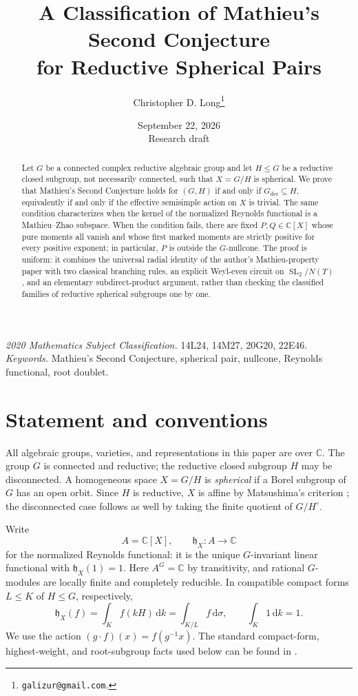 \documentclass[11pt]{article}
\title{A Classification of Mathieu's Second Conjecture\\for Reductive Spherical Pairs}
\author{Christopher D. Long\thanks{\texttt{galizur@gmail.com}.}}
\date{September 22, 2026\\[2pt]\small Research draft}
\numberwithin{equation}{section}
\theoremstyle{definition}
\theoremstyle{remark}
\newcommand{\C}{\mathbb C}
\newcommand{\hX}{\mathfrak h_X}
\newcommand{\dd}{\,\mathrm d}
\DeclareMathOperator{\SL}{SL}
\newcommand{\der}{\mathrm{der}}
\begin{document}
\maketitle
\begin{abstract}
Let $G$ be a connected complex reductive algebraic group and let $H\leq G$ be a reductive closed subgroup, not necessarily connected, such that $X=G/H$ is spherical. We prove that Mathieu's Second Conjecture holds for $(G,H)$ if and only if $G_{\der}\subseteq H$, equivalently if and only if the effective semisimple action on $X$ is trivial. The same condition characterizes when the kernel of the normalized Reynolds functional is a Mathieu--Zhao subspace. When the condition fails, there are fixed $P,Q\in\C[X]$ whose pure moments all vanish and whose first marked moments are strictly positive for every positive exponent; in particular, $P$ is outside the $G$-nullcone. The proof is uniform: it combines the universal radial identity of the author's Mathieu-property paper with two classical branching rules, an explicit Weyl-even circuit on $\SL_2/N(T)$, and an elementary subdirect-product argument, rather than checking the classified families of reductive spherical subgroups one by one.
\end{abstract}
\smallskip
\noindent\textit{2020 Mathematics Subject Classification.} 14L24, 14M27, 20G20, 22E46.\\
\textit{Keywords.} Mathieu's Second Conjecture, spherical pair, nullcone, Reynolds functional, root doublet.

\section{Statement and conventions}
All algebraic groups, varieties, and representations in this paper are over $\C$. The group $G$ is connected and reductive; the reductive closed subgroup $H$ may be disconnected. A homogeneous space $X=G/H$ is \emph{spherical} if a Borel subgroup of $G$ has an open orbit. Since $H$ is reductive, $X$ is affine by Matsushima's criterion \cite{Matsushima}; the disconnected case follows as well by taking the finite quotient of $G/H^\circ$.

Write
\[
 A=\C[X],\qquad
 \hX:A\longrightarrow\C
\]
for the normalized Reynolds functional: it is the unique $G$-invariant linear functional with $\hX(1)=1$. Here $A^G=\C$ by transitivity, and rational $G$-modules are locally finite and completely reducible. In compatible compact forms $L\leq K$ of $H\leq G$, respectively,
\begin{equation}\label{eq:compact}
 \hX(f)=\int_K f(kH)\dd k=\int_{K/L}f\dd\sigma,
 \qquad \int_K1\dd k=1.
\end{equation}
We use the action $(g\cdot f)(x)=f(g^{-1}x)$. The standard compact-form, highest-weight, and root-subgroup facts used below can be found in \cite{Borel,GoodmanWallach}.
\end{document}
